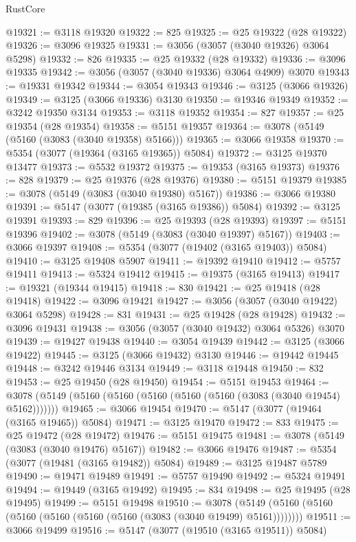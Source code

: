 \begin{lexlean}{RustCore}
\begin{coremodule}
@19321 := @3118 @19320
@19322 := 825
@19325 := @25 @19322 (@28 @19322)
@19326 := @3096 @19325
@19331 := @3056 (@3057 (@3040 @19326) @3064 @5298)
@19332 := 826
@19335 := @25 @19332 (@28 @19332)
@19336 := @3096 @19335
@19342 := @3056 (@3057 (@3040 @19336) @3064 @4909) @3070
@19343 := @19331 @19342
@19344 := @3054 @19343
@19346 := @3125 (@3066 @19326)
@19349 := @3125 (@3066 @19336) @3130
@19350 := @19346 @19349
@19352 := @3242 @19350 @3134
@19353 := @3118 @19352
@19354 := 827
@19357 := @25 @19354 (@28 @19354)
@19358 := @5151 @19357
@19364 := @3078 (@5149 (@5160 (@3083 (@3040 @19358) @5166)))
@19365 := @3066 @19358
@19370 := @5354 (@3077 (@19364 (@3165 @19365)) @5084)
@19372 := @3125 @19370 @13477
@19373 := @5532 @19372
@19375 := @19353 (@3165 @19373)
@19376 := 828
@19379 := @25 @19376 (@28 @19376)
@19380 := @5151 @19379
@19385 := @3078 (@5149 (@3083 (@3040 @19380) @5167))
@19386 := @3066 @19380
@19391 := @5147 (@3077 (@19385 (@3165 @19386)) @5084)
@19392 := @3125 @19391
@19393 := 829
@19396 := @25 @19393 (@28 @19393)
@19397 := @5151 @19396
@19402 := @3078 (@5149 (@3083 (@3040 @19397) @5167))
@19403 := @3066 @19397
@19408 := @5354 (@3077 (@19402 (@3165 @19403)) @5084)
@19410 := @3125 @19408 @5907
@19411 := @19392 @19410
@19412 := @5757 @19411
@19413 := @5324 @19412
@19415 := @19375 (@3165 @19413)
@19417 := @19321 (@19344 @19415)
@19418 := 830
@19421 := @25 @19418 (@28 @19418)
@19422 := @3096 @19421
@19427 := @3056 (@3057 (@3040 @19422) @3064 @5298)
@19428 := 831
@19431 := @25 @19428 (@28 @19428)
@19432 := @3096 @19431
@19438 := @3056 (@3057 (@3040 @19432) @3064 @5326) @3070
@19439 := @19427 @19438
@19440 := @3054 @19439
@19442 := @3125 (@3066 @19422)
@19445 := @3125 (@3066 @19432) @3130
@19446 := @19442 @19445
@19448 := @3242 @19446 @3134
@19449 := @3118 @19448
@19450 := 832
@19453 := @25 @19450 (@28 @19450)
@19454 := @5151 @19453
@19464 := @3078 (@5149 (@5160 (@5160 (@5160 (@5160 (@5160 (@3083 (@3040 @19454) @5162)))))))
@19465 := @3066 @19454
@19470 := @5147 (@3077 (@19464 (@3165 @19465)) @5084)
@19471 := @3125 @19470
@19472 := 833
@19475 := @25 @19472 (@28 @19472)
@19476 := @5151 @19475
@19481 := @3078 (@5149 (@3083 (@3040 @19476) @5167))
@19482 := @3066 @19476
@19487 := @5354 (@3077 (@19481 (@3165 @19482)) @5084)
@19489 := @3125 @19487 @5789
@19490 := @19471 @19489
@19491 := @5757 @19490
@19492 := @5324 @19491
@19494 := @19449 (@3165 @19492)
@19495 := 834
@19498 := @25 @19495 (@28 @19495)
@19499 := @5151 @19498
@19510 := @3078 (@5149 (@5160 (@5160 (@5160 (@5160 (@5160 (@5160 (@3083 (@3040 @19499) @5161))))))))
@19511 := @3066 @19499
@19516 := @5147 (@3077 (@19510 (@3165 @19511)) @5084)

\end{coremodule}
\end{lexlean}
